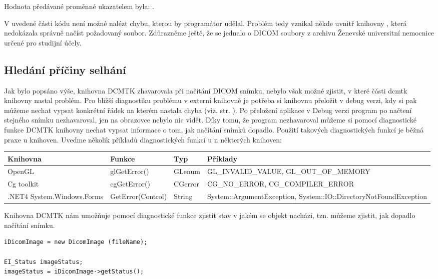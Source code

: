 Hodnota předávané proměnné ukazatelem  byla: .

V uvedené části kódu není možné nalézt chybu, kterou by programátor udělal. Problém tedy vznikal někde uvnitř knihovny , která nedokázala správně načíst požadovaný soubor. Zdůrazněme ještě, že se jednalo o DICOM soubory z archivu Ženevské universitní nemocnice určené pro studijní účely.

\subsection{Hledání příčiny selhání}
Jak bylo popsáno výše, knihovna DCMTK zhavarovala při načítání DICOM snímku, nebylo však možné zjistit, v které části dcmtk knihovny nastal problém. Pro bližší diagnostiku problému v externí knihovně je potřeba si knihovnu přeložit v debug verzi, kdy si pak můžeme nechat vypsat konkrétní řádek na kterém nastala chyba (viz. str. \pageref{releasedebug}).
Po přeložení aplikace v Debug verzi program po načtení stejného snímku nezhavaroval, jen na obrazovce nebylo nic vidět. Díky tomu, že program nezhavaroval můžeme si pomocí diagnostické funkce DCMTK knihovny nechat vypsat informace o tom, jak načítání snímků dopadlo. Použití takových diagnostických funkcí je běžná praxe u knihoven. Uveďme několik příkladů diagnostických funkcí u  n některých knihoven:

\hspace{-1cm}
\begin{tabular}{| p{3cm} | p{3cm} | p{2cm} | p{6cm} | }
  \hline                       
  Knihovna & Funkce & Typ & Příklady \\
  \hline
  \hline                     
  OpenGL & glGetError() & GLenum & GL\_INVALID\_VALUE, GL\_OUT\_OF\_MEMORY\\
  \hline
  Cg toolkit & cgGetError()  & CGerror & CG\_NO\_ERROR, CG\_COMPILER\_ERROR\\
  \hline
  .NET4 System\-.Windows\-.Forms & GetError(Control) & String & System\-::Argument\-Exception, System::IO\-::Directory\-NotFound\-Exception\\
  \hline
\end{tabular}

Knihovna DCMTK nám umožňuje pomocí diagnostické funkce  zjistit stav v jakém se objekt nachází, tzn. můžeme zjistit, jak dopadlo načítání snímku.

\begin{lstlisting}[label={xxx}]
iDicomImage = new DicomImage (fileName);

EI_Status imageStatus;
imageStatus = iDicomImage->getStatus();
\end{lstlisting}


